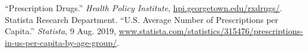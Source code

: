 \documentclass[10pt]{report}            %
\begin{document}
\begin{thebibliography}{9}
 ``Prescription Drugs.” \textit{Health Policy Institute}, \url{hpi.georgetown.edu/rxdrugs/}.
 Statista Research Department. ``U.S. Average Number of Prescriptions per Capita.” \textit{Statista}, 9 Aug. 2019, \url{www.statista.com/statistics/315476/prescriptions-in-us-per-capita-by-age-group/}.
\end{thebibliography}
\end{document}
